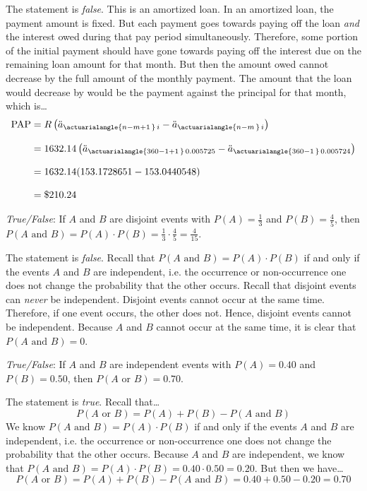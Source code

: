 \documentclass[11pt,letterpaper]{article}
\begin{document}
\sol The statement is \textit{false}. This is an amortized loan. In an amortized loan, the payment amount is fixed. But each payment goes towards paying off the loan \textit{and} the interest owed during that pay period simultaneously. Therefore, some portion of the initial payment should have gone towards paying off the interest due on the remaining loan amount for that month. But then the amount owed cannot decrease by the full amount of the monthly payment. The amount that the loan would decrease by would be the payment against the principal for that month, which is\dots
	\[
	\begin{aligned}
	\text{PAP}&= R \left( \ddot{a}_{\actuarialangle{n - m + 1\,}\, i} - \ddot{a}_{\actuarialangle{n - m\,}\, i} \right) \\[0.3cm]
	&=  1632.14 \left( \ddot{a}_{\actuarialangle{360 - 1 + 1\,}\, 0.005725} - \ddot{a}_{\actuarialangle{360 - 1\,}\, 0.005724} \right) \\[0.3cm]
	&= 1632.14 (153.1728651 - 153.0440548) \\[0.3cm]
	&= \$210.24
	\end{aligned}
	\] 



\newpage



\quizsol \textit{True/False}: If $A$ and $B$ are disjoint events with $P(A)= \frac{1}{3}$ and $P(B)= \frac{4}{5}$, then $P(A \text{ and } B)= P(A) \cdot P(B)= \frac{1}{3} \cdot \frac{4}{5}= \frac{4}{15}$. \pspace

\sol The statement is \textit{false}. Recall that $P(A \text{ and } B)= P(A) \cdot P(B)$ if and only if the events $A$ and $B$ are independent, i.e. the occurrence or non-occurrence one does not change the probability that the other occurs. Recall that disjoint events can \textit{never} be independent. Disjoint events cannot occur at the same time. Therefore, if one event occurs, the other does not. Hence, disjoint events cannot be independent. Because $A$ and $B$ cannot occur at the same time, it is clear that $P(A \text{ and } B)= 0$. \pvspace{1.3cm}



\quizsol \textit{True/False}: If $A$ and $B$ are independent events with $P(A)= 0.40$ and $P(B)= 0.50$, then $P(A \text{ or } B)= 0.70$. \pspace

\sol The statement is \textit{true}. Recall that\dots
	\[
	P(A \text{ or } B)= P(A) + P(B) - P(A \text{ and } B)
	\]
We know $P(A \text{ and } B)= P(A) \cdot P(B)$ if and only if the events $A$ and $B$ are independent, i.e. the occurrence or non-occurrence one does not change the probability that the other occurs. Because $A$ and $B$ are independent, we know that $P(A \text{ and } B)= P(A) \cdot P(B)= 0.40 \cdot 0.50= 0.20$. But then we have\dots
	\[
	P(A \text{ or } B)= P(A) + P(B) - P(A \text{ and } B)= 0.40 + 0.50 - 0.20= 0.70
	\] \pvspace{1.3cm}
\end{document}
